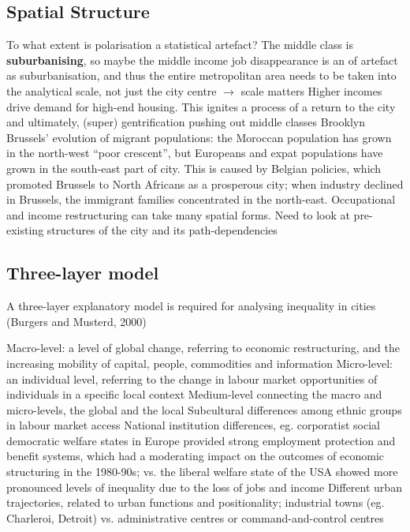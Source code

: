 \documentclass{article}
\begin{document}
\subsection{Spatial Structure}

\begin{outline}
	\1 To what extent is polarisation a statistical artefact?
The middle class is \textbf{suburbanising}, so maybe the middle income job disappearance is an of artefact as suburbanisation, and thus the entire metropolitan area needs to be taken into the analytical scale, not just the city centre $\rightarrow$ scale matters
	\1 Higher incomes drive demand for high-end housing. This ignites a process of a return to the city and ultimately, (super) gentrification pushing out middle classes
		\2 Brooklyn
		\2 Brussels' evolution of migrant populations: the Moroccan population has grown in the north-west ``poor crescent'', but Europeans and expat populations have grown in the south-east part of city. This is caused by Belgian policies, which promoted Brussels to North Africans as a prosperous city; when industry declined in Brussels, the immigrant families concentrated in the north-east.
	\1 Occupational and income restructuring can take many spatial forms. Need to look at pre-existing structures of the city and its path-dependencies
\end{outline}

\subsection{Three-layer model}

A three-layer explanatory model is required for analysing inequality in cities (Burgers and Musterd, 2000)

\begin{outline}
	\1 Macro-level: a level of global change, referring to economic restructuring, and the increasing mobility of capital, people, commodities and information
	\1 Micro-level: an individual level, referring to the change in labour market opportunities of individuals in a specific local context
	\1 Medium-level connecting the macro and micro-levels, the global and the local
		\2 Subcultural differences among ethnic groups in labour market access
		\2 National institution differences, eg. corporatist social democratic welfare states in Europe provided strong employment protection and benefit systems, which had a moderating impact on the outcomes of economic structuring in the 1980-90s; vs. the liberal welfare state of the USA showed more pronounced levels of inequality due to the loss of jobs and income
		\2 Different urban trajectories, related to urban functions and positionality; industrial towns (eg. Charleroi, Detroit) vs. administrative centres or command-and-control centres
\end{outline}
\end{document}

